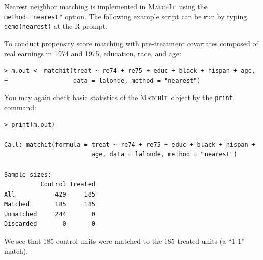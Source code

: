 \documentclass[oneside,letterpaper,titlepage]{article}
\newcommand{\MatchIt}{\textsc{MatchIt}}
\begin{document}
Nearest neighbor matching is implemented in \MatchIt\ using the
\texttt{method="nearest"} option.  The following example script can be
run by typing {\tt demo(nearest)} at the R prompt.

To conduct propensity score matching with pre-treatment covariates
composed of real earnings in 1974 and 1975, education, race, and age:
\begin{verbatim}
> m.out <- matchit(treat ~ re74 + re75 + educ + black + hispan + age,
+                  data = lalonde, method = "nearest")
\end{verbatim}

\noindent You may again check basic statistics of the \MatchIt\ object by the
\texttt{print} command:
\begin{verbatim}
> print(m.out)

Call: matchit(formula = treat ~ re74 + re75 + educ + black + hispan +
                        age, data = lalonde, method = "nearest")

Sample sizes:
          Control Treated
All           429     185
Matched       185     185
Unmatched     244       0
Discarded       0       0
\end{verbatim}

We see that 185 control units were matched to the 185 treated units (a
``1-1'' match).  
\end{document}
